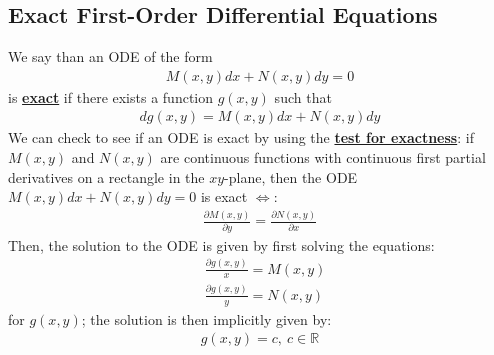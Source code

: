 \documentclass[11pt]{article}
\newcommand{\dfn}[1]{\underline{\textbf{#1}}}
\newcommand{\R}[0]{\mathbb{R}}
\begin{document}
\subsection{Exact First-Order Differential Equations}
We say than an ODE of the form 
\begin{align*}
	M(x,y) dx + N(x,y) dy = 0 
\end{align*}
is \dfn{exact} if there exists a function $g(x,y)$ such that
\begin{align}
	d g(x,y) = M(x,y) dx + N(x,y) dy 	
\end{align}
We can check to see if an ODE is exact by using the \dfn{test for exactness}: if $M(x,y)$ and $N(x,y)$ are continuous functions with continuous first partial derivatives on a rectangle in the $xy$-plane, then the ODE $M(x,y) dx + N(x,y) dy = 0 $ is exact $\iff$: 
\begin{align}
	\frac{\partial M(x,y)}{\partial y} = \frac{\partial N(x,y)}{\partial x}	
\end{align}
Then, the solution to the ODE is given by first solving the equations: 
\begin{align*}
	& \frac{\partial g(x,y)}{x} = M(x,y) \\
	& \frac{\partial g(x,y)}{y} = N(x,y) 
\end{align*}
for $g(x,y)$; the solution is then implicitly given by:
\begin{align}
	g(x,y) = c,\ c \in \R 	
\end{align}
\end{document}
